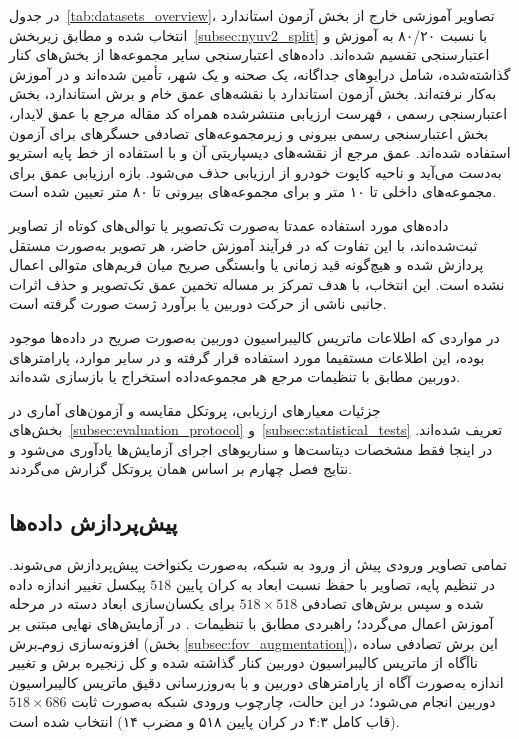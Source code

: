در جدول~\ref{tab:datasets_overview}، تصاویر آموزشی  خارج از بخش آزمون استاندارد انتخاب شده و مطابق زیربخش~\ref{subsec:nyuv2_split} با نسبت ۸۰/۲۰ به آموزش و اعتبارسنجی تقسیم شده‌اند. داده‌های اعتبارسنجی سایر مجموعه‌ها از بخش‌های کنار گذاشته‌شده، شامل درایوهای جداگانه، یک صحنه و یک شهر، تأمین شده‌اند و در آموزش به‌کار نرفته‌اند. بخش آزمون استاندارد  با نقشه‌های عمق خام و برش استاندارد، بخش اعتبارسنجی رسمی ، فهرست ارزیابی  منتشرشده همراه کد مقاله مرجع با عمق لایدار، بخش اعتبارسنجی رسمی بیرونی  و زیرمجموعه‌های تصادفی حسگرهای  برای آزمون استفاده شده‌اند. عمق مرجع  از نقشه‌های دیسپاریتی آن و با استفاده از خط پایه استریو به‌دست می‌آید و ناحیه کاپوت خودرو از ارزیابی حذف می‌شود. بازه ارزیابی عمق برای مجموعه‌های داخلی تا ۱۰ متر و برای مجموعه‌های بیرونی تا ۸۰ متر تعیین شده است.

داده‌های مورد استفاده عمدتا به‌صورت تک‌تصویر یا توالی‌های کوتاه از تصاویر ثبت‌شده‌اند، با این تفاوت که در فرآیند آموزش حاضر، هر تصویر به‌صورت مستقل پردازش شده و هیچ‌گونه قید زمانی یا وابستگی صریح میان فریم‌های متوالی اعمال نشده است. این انتخاب، با هدف تمرکز بر مساله تخمین عمق تک‌تصویر و حذف اثرات جانبی ناشی از حرکت دوربین یا برآورد ژست صورت گرفته است.

در مواردی که اطلاعات ماتریس کالیبراسیون دوربین به‌صورت صریح در داده‌ها موجود بوده، این اطلاعات مستقیما مورد استفاده قرار گرفته و در سایر موارد، پارامترهای دوربین مطابق با تنظیمات مرجع هر مجموعه‌داده استخراج یا بازسازی شده‌اند.




جزئیات معیارهای ارزیابی، پروتکل مقایسه و آزمون‌های آماری در بخش‌های~\ref{subsec:evaluation_protocol} و~\ref{subsec:statistical_tests} تعریف شده‌اند. در اینجا فقط مشخصات دیتاست‌ها و سناریوهای اجرای آزمایش‌ها یادآوری می‌شود و نتایج فصل چهارم بر اساس همان پروتکل گزارش می‌گردند.




\subsection{پیش‌پردازش داده‌ها}

تمامی تصاویر ورودی پیش از ورود به شبکه، به‌صورت یکنواخت پیش‌پردازش می‌شوند. در تنظیم پایه، تصاویر با حفظ نسبت ابعاد به کران پایین $518$ پیکسل تغییر اندازه داده شده و سپس برش‌های تصادفی $518 \times 518$ برای یکسان‌سازی ابعاد دسته در مرحله آموزش اعمال می‌گردد؛ راهبردی مطابق با تنظیمات \basemodel{} \cite{DepthAnythingV2}. در آزمایش‌های نهایی مبتنی بر افزونه‌سازی زوم‌ـ‌برش (بخش \ref{subsec:fov_augmentation})، این برش تصادفی ساده ناآگاه از ماتریس کالیبراسیون دوربین کنار گذاشته شده و کل زنجیره برش و تغییر اندازه به‌صورت آگاه از پارامترهای دوربین و با به‌روزرسانی دقیق ماتریس کالیبراسیون دوربین انجام می‌شود؛ در این حالت، چارچوب ورودی شبکه به‌صورت ثابت $518 \times 686$ (قاب کامل ۴:۳ در کران پایین ۵۱۸ و مضرب ۱۴) انتخاب شده است.

